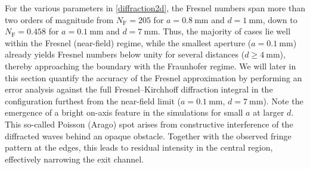 \documentclass[../Thesis-IJspeert.tex]{subfiles}
\begin{document}
For the various parameters in \autoref{diffraction2d}, the Fresnel numbers span more than two orders of magnitude from $N_\mathrm{F} = 205$ for $a=\SI{0.8}{\milli\meter}$ and $d=\SI{1}{\milli\meter}$, down to $N_\mathrm{F} = 0.458$ for $a=\SI{0.1}{\milli\meter}$ and $d=\SI{7}{\milli\meter}$. Thus, the majority of cases lie well within the Fresnel (near-field) regime, while the smallest aperture ($a=\SI{0.1}{\milli\meter}$) already yields Fresnel numbers below unity for several distances ($d\ge \SI{4}{\milli\meter}$), thereby approaching the boundary with the Fraunhofer regime. We will later in this section quantify the accuracy of the Fresnel approximation by performing an error analysis against the full Fresnel--Kirchhoff diffraction integral in the configuration furthest from the near-field limit ($a=\SI{0.1}{\milli\meter}$, $d=\SI{7}{\milli\meter}$). Note the emergence of a bright on-axis feature in the simulations for small $a$ at larger $d$. This so-called Poisson (Arago) spot arises from constructive interference of the diffracted waves behind an opaque obstacle. Together with the observed fringe pattern at the edges, this leads to residual intensity in the central region, effectively narrowing the exit channel.
\end{document}
